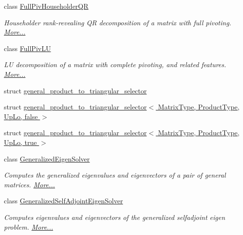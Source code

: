 \begin{DoxyCompactItemize}
class \hyperlink{group___q_r___module_class_eigen_1_1_full_piv_householder_q_r}{Full\+Piv\+Householder\+QR}
\begin{DoxyCompactList}\small\item\em Householder rank-\/revealing QR decomposition of a matrix with full pivoting.  \hyperlink{group___q_r___module_class_eigen_1_1_full_piv_householder_q_r}{More...}\end{DoxyCompactList}\item 
class \hyperlink{group___l_u___module_class_eigen_1_1_full_piv_l_u}{Full\+Piv\+LU}
\begin{DoxyCompactList}\small\item\em LU decomposition of a matrix with complete pivoting, and related features.  \hyperlink{group___l_u___module_class_eigen_1_1_full_piv_l_u}{More...}\end{DoxyCompactList}\item 
struct \hyperlink{struct_eigen_1_1general__product__to__triangular__selector}{general\+\_\+product\+\_\+to\+\_\+triangular\+\_\+selector}
\item 
struct \hyperlink{struct_eigen_1_1general__product__to__triangular__selector_3_01_matrix_type_00_01_product_type_00_01_up_lo_00_01false_01_4}{general\+\_\+product\+\_\+to\+\_\+triangular\+\_\+selector$<$ Matrix\+Type, Product\+Type, Up\+Lo, false $>$}
\item 
struct \hyperlink{struct_eigen_1_1general__product__to__triangular__selector_3_01_matrix_type_00_01_product_type_00_01_up_lo_00_01true_01_4}{general\+\_\+product\+\_\+to\+\_\+triangular\+\_\+selector$<$ Matrix\+Type, Product\+Type, Up\+Lo, true $>$}
\item 
class \hyperlink{group___eigenvalues___module_class_eigen_1_1_generalized_eigen_solver}{Generalized\+Eigen\+Solver}
\begin{DoxyCompactList}\small\item\em Computes the generalized eigenvalues and eigenvectors of a pair of general matrices.  \hyperlink{group___eigenvalues___module_class_eigen_1_1_generalized_eigen_solver}{More...}\end{DoxyCompactList}\item 
class \hyperlink{group___eigenvalues___module_class_eigen_1_1_generalized_self_adjoint_eigen_solver}{Generalized\+Self\+Adjoint\+Eigen\+Solver}
\begin{DoxyCompactList}\small\item\em Computes eigenvalues and eigenvectors of the generalized selfadjoint eigen problem.  \hyperlink{group___eigenvalues___module_class_eigen_1_1_generalized_self_adjoint_eigen_solver}{More...}\end{DoxyCompactList}\item 

\end{DoxyCompactItemize}
